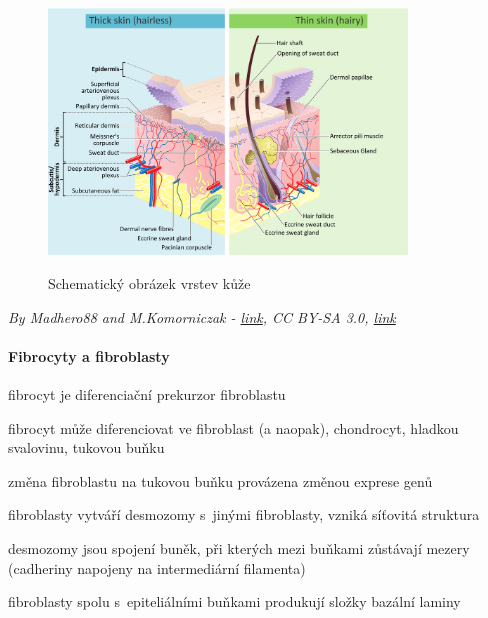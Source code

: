 \documentclass[DIV=8]{scrreprt}
\begin{document}
\begin{figure}
    \caption{Schematický obrázek vrstev kůže}
    \includegraphics[width=0.85\textwidth]{kuze.png}
    \centering
    \label{}
\end{figure}

\emph{By Madhero88 and M.Komorniczak - \href{https://en.wikipedia.org/wiki/File:Skin_layers.png}{link}, CC BY-SA 3.0, \href{https://commons.wikimedia.org/w/index.php?curid=21986708}{link}}

\paragraph{Fibrocyty a fibroblasty}
\begin{myItemize}[nosep]
    \item fibrocyt je diferenciační prekurzor fibroblastu
    \item fibrocyt může diferenciovat ve fibroblast (a naopak), chondrocyt, hladkou svalovinu, tukovou buňku
    \item změna fibroblastu na tukovou buňku provázena změnou exprese genů
    \item fibroblasty vytváří desmozomy s jinými fibroblasty, vzniká síťovitá struktura
\begin{myItemize}[nosep]
    \item desmozomy jsou spojení buněk, při kterých mezi buňkami zůstávají mezery (cadheriny napojeny na intermediární filamenta)
\end{myItemize}

    \item fibroblasty spolu s epiteliálními buňkami produkují složky bazální laminy
\end{myItemize}
\end{document}
